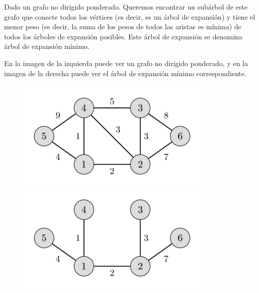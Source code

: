 Dado un grafo no dirigido ponderado. Queremos encontrar un subárbol de este grafo que conecte todos los vértices (es decir, es un árbol de expansión) y tiene el menor peso (es decir, la suma de los pesos de todos las aristas es mínima) de todos los árboles de expansión posibles. Este árbol de expansión se denomina árbol de expansión mínimo.

En la imagen de la izquierda puede ver un grafo no dirigido ponderado, y en la imagen de la derecha puede ver el árbol de expansión mínimo correspondiente.

\begin{figure}[h!]
	\centering
	\includegraphics[width=0.45\linewidth]{img/MST_before}
	\includegraphics[width=0.45\linewidth]{img/MST_after}
	\label{fig:mstbefore}
\end{figure}
